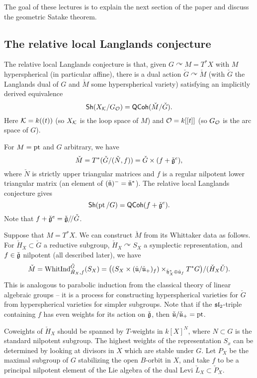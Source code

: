 \documentclass{article}
\begin{document}
The goal of these lectures is to explain the next section of the paper and discuss the geometric Satake theorem.

\subsection{The relative local Langlands conjecture}

The relative local Langlands conjecture is that, given $G \curvearrowright M = T^*X$ with $M$ hyperspherical (in particular affine), there is a dual action $\check{G} \curvearrowright \check{M}$ (with $\check{G}$ the Langlands dual of $G$ and $\check{M}$ some hyperspherical variety) satisfying an implicitly derived equivalence
\[
	\mathsf{Sh}(X_{\mathcal{K}} / G_{\mathcal{O}}) = \mathsf{QCoh}(\check{M} / \check{G}).
\]
Here $\mathcal{K} = k((t))$ (so $X_{\mathcal{K}}$ is the loop space of $M$) and $\mathcal{O} = k[[t]]$ (so $G_{\mathcal{O}}$ is the arc space of $G$).

\begin{ex}
	For $M = \operatorname{pt}$ and $G$ arbitrary, we have 
	\[
		\check{M} = T^*(\check{G} / (\check{N}, f)) = \check{G} \times (f + \check{\mathfrak{g}}^e),
	\]
	where $\check{N}$ is strictly upper triangular matrices and $f$ is a regular nilpotent lower triangular matrix (an element of $(\check{\mathfrak{n}})^- = \check{\mathfrak{n}}^*$).
	The relative local Langlands conjecture gives
	\[
		\mathsf{Sh}(\operatorname{pt} / G) = \mathsf{QCoh}(f + \check{\mathfrak{g}}^e).
	\]
	Note that $f + \check{\mathfrak{g}}^e = \check{\mathfrak{g}} /\mkern-3mu/ \check{G}$.
\end{ex}

Suppose that $M = T^*X$.
We can construct $\check{M}$ from its Whittaker data as follows.
For $\check{H}_X \subset \check{G}$ a reductive subgroup, $\check{H}_X \curvearrowright S_X$ a symplectic representation, and $f \in \check{\mathfrak{g}}$ nilpotent (all described later), we have
\[
	\check{M} = \operatorname{WhitInd}_{\check{H}_X,f}^{\check{G}}(S_X) = \big((S_X \times (\check{\mathfrak{u}} / \check{\mathfrak{u}}_+)_f) \times_{\check{\mathfrak{h}}_X^* \oplus \check{\mathfrak{u}}_f} T^* G\big) / (\check{H}_X \check{U}).
\]
This is analogous to parabolic induction from the classical theory of linear algebraic groups -- it is a process for constructing hyperspherical varieties for $\check{G}$ from hyperspherical varieties for simpler subgroups.
Note that if the $\mathfrak{sl}_2$-triple containing $f$ has even weights for its action on $\check{\mathfrak{g}}$, then $\check{\mathfrak{u}} / \check{\mathfrak{u}}_+ = \operatorname{pt}$.

Coweights of $\check{H}_X$ should be spanned by $T$-weights in $k[X]^N$, where $N \subset G$ is the standard nilpotent subgroup.
The highest weights of the representation $S_x$ can be determined by looking at divisors in $X$ which are stable under $G$.
Let $P_X$ be the maximal subgroup of $G$ stabilizing the open $B$-orbit in $X$, and take $f$ to be a principal nilpotent element of the Lie algebra of the dual Levi $\check{L}_X \subset \check{P}_X$.
\end{document}
